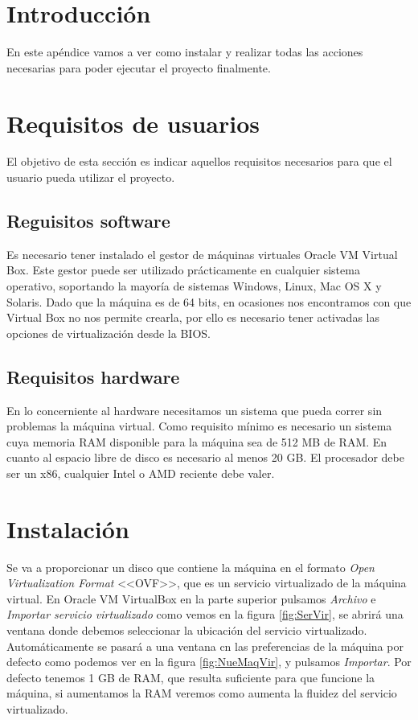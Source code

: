 
\section{Introducción}
En este apéndice vamos a ver como instalar y realizar todas las acciones necesarias para poder ejecutar el proyecto finalmente.

\section{Requisitos de usuarios}
El objetivo de esta sección es indicar aquellos requisitos necesarios para que el usuario pueda utilizar el proyecto.

\subsection{Reguisitos software}
Es necesario tener instalado el gestor de máquinas virtuales Oracle VM Virtual Box. Este gestor puede ser utilizado prácticamente en cualquier sistema operativo, soportando la mayoría de sistemas Windows, Linux, Mac OS X y Solaris. Dado que la máquina es de 64 bits, en ocasiones nos encontramos con que Virtual Box no nos permite crearla, por ello es necesario tener activadas las opciones de virtualización desde la BIOS.

\subsection{Requisitos hardware}
En lo concerniente al hardware necesitamos un sistema que pueda correr sin problemas la máquina virtual. Como requisito mínimo es necesario un sistema cuya memoria RAM disponible para la máquina sea de 512 MB de RAM. En cuanto al espacio libre de disco es necesario al menos 20 GB. El procesador debe ser un x86, cualquier Intel o AMD reciente debe valer\cite{requeriments_VirtualBox}.


\section{Instalación}
Se va a proporcionar un disco que contiene la máquina en el formato \textit{Open Virtualization Format} <<OVF>>, que es un servicio virtualizado de la máquina virtual. En Oracle VM VirtualBox en la parte superior pulsamos \textit{Archivo} e \textit{Importar servicio virtualizado} como vemos en la figura \ref{fig:SerVir}, se abrirá una ventana donde debemos seleccionar la ubicación del servicio virtualizado. Automáticamente se pasará a una ventana cn las preferencias de la máquina por defecto como podemos ver en la figura \ref{fig:NueMaqVir}, y pulsamos \textit{Importar}. Por defecto tenemos 1 GB de RAM, que resulta suficiente para que funcione la máquina, si aumentamos la RAM veremos como aumenta la fluidez del servicio virtualizado.

